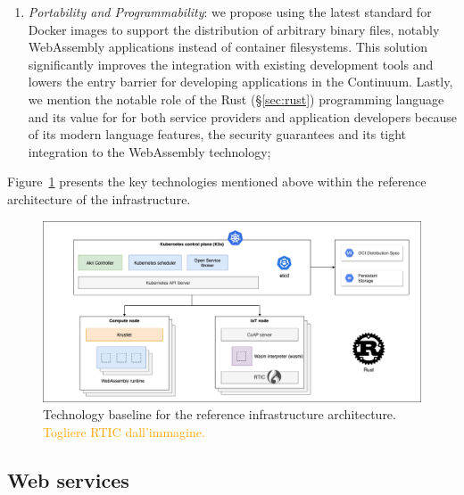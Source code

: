 \begin{enumerate}
    \item \emph{Portability and Programmability}: we propose using the latest standard for Docker images to support the distribution of arbitrary binary files, notably WebAssembly applications instead of container filesystems. This solution significantly improves the integration with existing development tools and lowers the entry barrier for developing applications in the Continuum. Lastly, we mention the notable role of the Rust (§\ref{sec:rust}) programming language and its value for for both service providers and application developers because of its modern language features, the security guarantees and its tight integration to the WebAssembly technology;
\end{enumerate}


Figure~\ref{fig:architecture-technologies} presents the key technologies mentioned above within the reference architecture of the infrastructure.

\begin{figure}[ht]
\centering
\includegraphics[width=\columnwidth]{figures/architecture-technologies}
\caption{Technology baseline for the reference infrastructure architecture. \textcolor{orange}{Togliere RTIC dall'immagine.}} \label{fig:architecture-technologies}
\end{figure}

\subsection{Web services}
\label{sec:web}

